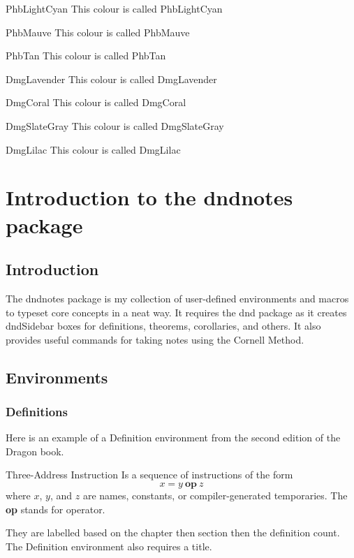 \documentclass[letterpaper,10pt,twoside,onecolumn,openany,draft]{book}
\begin{document}
\begin{DndSidebar}[color=PhbLightCyan]{PhbLightCyan}
  This colour is called PhbLightCyan
\end{DndSidebar}

\begin{DndSidebar}[color=PhbMauve]{PhbMauve}
  This colour is called PhbMauve
\end{DndSidebar}

\begin{DndSidebar}[color=PhbTan]{PhbTan}
  This colour is called PhbTan
\end{DndSidebar}

\begin{DndSidebar}[color=DmgLavender]{DmgLavender}
  This colour is called DmgLavender
\end{DndSidebar}

\begin{DndSidebar}[color=DmgCoral]{DmgCoral}
  This colour is called DmgCoral
\end{DndSidebar}

\begin{DndSidebar}[color=DmgSlateGray]{DmgSlateGray}
  This colour is called DmgSlateGray
\end{DndSidebar}

\begin{DndSidebar}[color=DmgLilac]{DmgLilac}
  This colour is called DmgLilac
\end{DndSidebar}

\part{Introduction to the dndnotes package}
\chapter{Introduction}
The dndnotes package is my collection of user-defined environments and macros to typeset core concepts in a neat way. It requires the dnd package as it creates dndSidebar boxes for definitions, theorems, corollaries, and others. 
It also provides useful commands for taking notes using the Cornell Method.

\chapter{Environments}

\section{Definitions}
Here is an example of a Definition environment from the second edition of the Dragon book.
\begin{Definition}{Three-Address Instruction}
  Is a sequence of instructions of the form 
  \[ x = y\ \textbf{op}\ z \] 
  where $x$, $y$, and $z$ are names, constants, or compiler-generated temporaries. 
  The \textbf{op} stands for operator. 
\end{Definition}
They are labelled based on the chapter then section then the definition count.
The Definition environment also requires a title.
\end{document}
